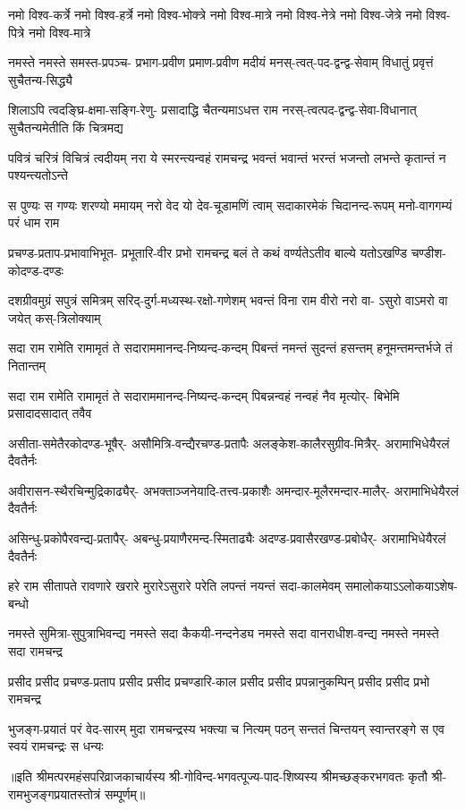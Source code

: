 \fourlineindentedshloka
{नमो विश्व-कर्त्रे नमो विश्व-हर्त्रे}
{नमो विश्व-भोक्त्रे नमो विश्व-मात्रे}
{नमो विश्व-नेत्रे नमो विश्व-जेत्रे}
{नमो विश्व-पित्रे नमो विश्व-मात्रे}%

\fourlineindentedshloka
{नमस्ते नमस्ते समस्त-प्रपञ्च-}
{प्रभाग-प्रवीण प्रमाण-प्रवीण}
{मदीयं मनस्-त्वत्-पद-द्वन्द्व-सेवाम्}
{विधातुं प्रवृत्तं सुचैतन्य-सिद्ध्यै}%

\fourlineindentedshloka
{शिलाऽपि त्वदङ्घ्रि-क्षमा-सङ्गि-रेणु-}
{प्रसादाद्धि चैतन्यमाऽधत्त राम}
{नरस्-त्वत्पद-द्वन्द्व-सेवा-विधानात्}
{सुचैतन्यमेतीति किं चित्रमद्य}%

\fourlineindentedshloka
{पवित्रं चरित्रं विचित्रं त्वदीयम्}
{नरा ये स्मरन्त्यन्वहं रामचन्द्र}
{भवन्तं भवान्तं भरन्तं भजन्तो}
{लभन्ते कृतान्तं न पश्यन्त्यतोऽन्ते}%

\fourlineindentedshloka
{स पुण्यः स गण्यः शरण्यो ममायम्}
{नरो वेद यो देव-चूडामणिं त्वाम्}
{सदाकारमेकं चिदानन्द-रूपम्}
{मनो-वागगम्यं परं धाम राम}%

\fourlineindentedshloka
{प्रचण्ड-प्रताप-प्रभावाभिभूत-}
{प्रभूतारि-वीर प्रभो रामचन्द्र}
{बलं ते कथं वर्ण्यतेऽतीव बाल्ये}
{यतोऽखण्डि चण्डीश-कोदण्ड-दण्डः}%

\fourlineindentedshloka
{दशग्रीवमुग्रं सपुत्रं समित्रम्}
{सरिद्-दुर्ग-मध्यस्थ-रक्षो-गणेशम्}
{भवन्तं विना राम वीरो नरो वा-}
{ऽसुरो वाऽमरो वा जयेत् कस्-त्रिलोक्याम्}%

\fourlineindentedshloka
{सदा राम रामेति रामामृतं ते}
{सदाराममानन्द-निष्यन्द-कन्दम्}
{पिबन्तं नमन्तं सुदन्तं हसन्तम्}
{हनूमन्तमन्तर्भजे तं नितान्तम्}%

\fourlineindentedshloka
{सदा राम रामेति रामामृतं ते}
{सदाराममानन्द-निष्यन्द-कन्दम्}
{पिबन्नन्वहं नन्वहं नैव मृत्योर्-}
{बिभेमि प्रसादादसादात् तवैव}%

\fourlineindentedshloka
{असीता-समेतैरकोदण्ड-भूषैर्-}
{असौमित्रि-वन्द्यैरचण्ड-प्रतापैः}
{अलङ्केश-कालैरसुग्रीव-मित्रैर्-}
{अरामाभिधेयैरलं दैवतैर्नः}%

\fourlineindentedshloka
{अवीरासन-स्थैरचिन्मुद्रिकाढ्यैर्-}
{अभक्ताञ्जनेयादि-तत्त्व-प्रकाशैः}
{अमन्दार-मूलैरमन्दार-मालैर्-}
{अरामाभिधेयैरलं दैवतैर्नः}%

\fourlineindentedshloka
{असिन्धु-प्रकोपैरवन्द्य-प्रतापैर्-}
{अबन्धु-प्रयाणैरमन्द-स्मिताढ्यैः}
{अदण्ड-प्रवासैरखण्ड-प्रबोधैर्-}
{अरामाभिधेयैरलं दैवतैर्नः}%

\fourlineindentedshloka
{हरे राम सीतापते रावणारे}
{खरारे मुरारेऽसुरारे परेति}
{लपन्तं नयन्तं सदा-कालमेवम्}
{समालोकयाऽऽलोकयाऽशेष-बन्धो}%

\fourlineindentedshloka
{नमस्ते सुमित्रा-सुपुत्राभिवन्द्य}
{नमस्ते सदा कैकयी-नन्दनेड्य}
{नमस्ते सदा वानराधीश-वन्द्य}
{नमस्ते नमस्ते सदा रामचन्द्र}%

\fourlineindentedshloka
{प्रसीद प्रसीद प्रचण्ड-प्रताप}
{प्रसीद प्रसीद प्रचण्डारि-काल}
{प्रसीद प्रसीद प्रपन्नानुकम्पिन्}
{प्रसीद प्रसीद प्रभो रामचन्द्र}%

\fourlineindentedshloka
{भुजङ्ग-प्रयातं परं वेद-सारम्}
{मुदा रामचन्द्रस्य भक्त्या च नित्यम्}
{पठन् सन्ततं चिन्तयन् स्वान्तरङ्गे}
{स एव स्वयं रामचन्द्रः स धन्यः}%

{॥इति श्रीमत्परमहंसपरिव्राजकाचार्यस्य श्री-गोविन्द-भगवत्पूज्य-पाद-शिष्यस्य 
श्रीमच्छङ्करभगवतः कृतौ श्री-रामभुजङ्गप्रयातस्तोत्रं सम्पूर्णम्॥}

\closesection
